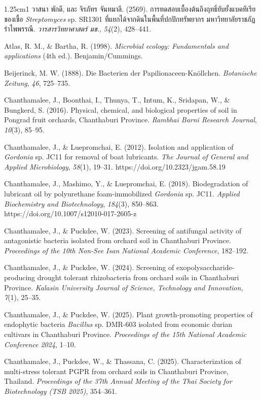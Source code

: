 \begin{hangparas}{1.25cm}{1}
วาสนา พักดี, และ จิรภัทร จันทมาลี. (2569). การทดสอบเบื้องต้นถึงฤทธิ์ยับยั้งแบคทีเรียของเชื้อ \textit{Streptomyces} sp. SR1301 ที่แยกได้จากดินในพื้นที่ปกปักทรัพยากร มหาวิทยาลัยราชภัฏรำไพพรรณี. \textit{วารสารวิทยาศาสตร์ มข.}, \textit{54}(2), 428--441.

Atlas, R. M., \& Bartha, R. (1998). \textit{Microbial ecology: Fundamentals and applications} (4th ed.). Benjamin/Cummings.

Beijerinck, M. W. (1888). Die Bacterien der Papilionaceen-Knöllchen. \textit{Botanische Zeitung}, \textit{46}, 725--735.

Chanthamalee, J., Boonthai, I., Thunya, T., Intum, K., Sridapan, W., \& Bungkerd, S. (2016). Physical, chemical, and biological properties of soil in Pongrad fruit orchards, Chanthaburi Province. \textit{Rambhai Barni Research Journal}, \textit{10}(3), 85--95.

Chanthamalee, J., \& Luepromchai, E. (2012). Isolation and application of \textit{Gordonia} sp. JC11 for removal of boat lubricants. \textit{The Journal of General and Applied Microbiology}, \textit{58}(1), 19--31. https://doi.org/10.2323/jgam.58.19

Chanthamalee, J., Mashimo, Y., \& Luepromchai, E. (2018). Biodegradation of lubricant oil by polyurethane foam-immobilized \textit{Gordonia} sp. JC11. \textit{Applied Biochemistry and Biotechnology}, \textit{184}(3), 850--863. https://doi.org/10.1007/s12010-017-2605-z

Chanthamalee, J., \& Puckdee, W. (2023). Screening of antifungal activity of antagonistic bacteria isolated from orchard soil in Chanthaburi Province. \textit{Proceedings of the 10th Non-See Isan National Academic Conference}, 182--192.

Chanthamalee, J., \& Puckdee, W. (2024). Screening of exopolysaccharide-producing drought tolerant rhizobacteria from orchard soils in Chanthaburi Province. \textit{Kalasin University Journal of Science, Technology and Innovation}, \textit{7}(1), 25--35.

Chanthamalee, J., \& Puckdee, W. (2025). Plant growth-promoting properties of endophytic bacteria \textit{Bacillus} sp. DMR-603 isolated from economic durian cultivars in Chanthaburi Province. \textit{Proceedings of the 15th National Academic Conference 2024}, 1--10.

Chanthamalee, J., Puckdee, W., \& Thassana, C. (2025). Characterization of multi-stress tolerant PGPR from orchard soils in Chanthaburi Province, Thailand. \textit{Proceedings of the 37th Annual Meeting of the Thai Society for Biotechnology (TSB 2025)}, 354--361.


\end{hangparas}
